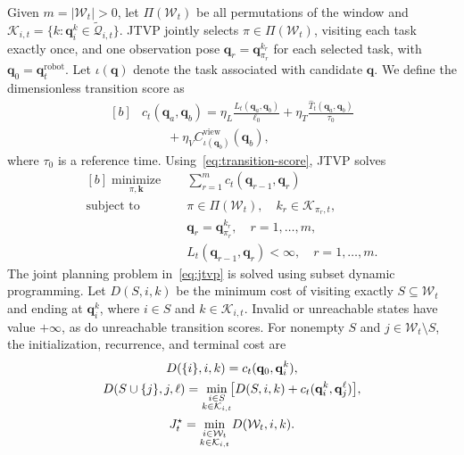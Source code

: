 \documentclass[letterpaper,10pt,journal]{IEEEtran}
\begin{document}
Given $m=|\mathcal W_t|>0$, let $\Pi(\mathcal W_t)$ be all permutations of the window and $\mathcal K_{i,t}=\{k:\mathbf q_i^k\in\widetilde{\mathcal Q}_{i,t}\}$. JTVP jointly selects $\pi\in\Pi(\mathcal W_t)$, visiting each task exactly once, and one observation pose $\mathbf{q}_r=\mathbf{q}_{\pi_r}^{k_r}$ for each selected task, with $\mathbf{q}_0=\mathbf{q}_t^{\mathrm{robot}}$. Let $\iota(\mathbf{q})$ denote the task associated with candidate $\mathbf{q}$. We define the dimensionless transition score as
\begin{equation}
\begin{aligned}[b]
&c_t(\mathbf{q}_a,\mathbf{q}_b)=
\eta_L\frac{L_t(\mathbf{q}_a,\mathbf{q}_b)}{\ell_0}
+\eta_T\frac{\widehat T_t(\mathbf{q}_a,\mathbf{q}_b)}{\tau_0}\\
&\qquad{}+\eta_V C_{\iota(\mathbf{q}_b)}^{\mathrm{view}}(\mathbf{q}_b),
\end{aligned}
\label{eq:transition-score}
\end{equation}
where $\tau_0$ is a reference time. Using~\eqref{eq:transition-score}, JTVP solves
\begin{equation}
\begin{aligned}[b]
\underset{\pi,\mathbf{k}}{\operatorname{minimize}}\quad
&\sum_{r=1}^{m}c_t(\mathbf{q}_{r-1},\mathbf{q}_r)\\
\operatorname{subject\ to}\quad
&\pi\in\Pi(\mathcal W_t),\quad k_r\in\mathcal K_{\pi_r,t},\\
&\mathbf q_r=\mathbf q_{\pi_r}^{k_r},\quad r=1,\ldots,m,\\
&L_t(\mathbf{q}_{r-1},\mathbf{q}_r)<\infty,\quad r=1,\ldots,m.
\end{aligned}
\label{eq:jtvp}
\end{equation}
The joint planning problem in~\eqref{eq:jtvp} is solved using subset dynamic programming. Let $D(S,i,k)$ be the minimum cost of visiting exactly $S\subseteq\mathcal W_t$ and ending at $\mathbf q_i^k$, where $i\in S$ and $k\in\mathcal K_{i,t}$. Invalid or unreachable states have value $+\infty$, as do unreachable transition scores. For nonempty $S$ and $j\in\mathcal W_t\setminus S$, the initialization, recurrence, and terminal cost are
\begin{subequations}\label{eq:subset-dp}
\begin{gather}
D(\{i\},i,k)=c_t(\mathbf{q}_0,\mathbf{q}_i^k),
\label{eq:dp-init}\\
\makebox[0pt][c]{\(\displaystyle
D(S\cup\{j\},j,\ell)=
\min_{\substack{i\in S\\ k\in\mathcal K_{i,t}}}\!\bigl[D(S,i,k)+c_t(\mathbf{q}_i^k,\mathbf{q}_j^\ell)\bigr],
\)}
\label{eq:dp-recurrence}\\
J_t^\star=\min_{\substack{i\in\mathcal W_t\\k\in\mathcal K_{i,t}}}
D(\mathcal W_t,i,k).
\label{eq:dp-terminal}
\end{gather}
\end{subequations}
\end{document}
